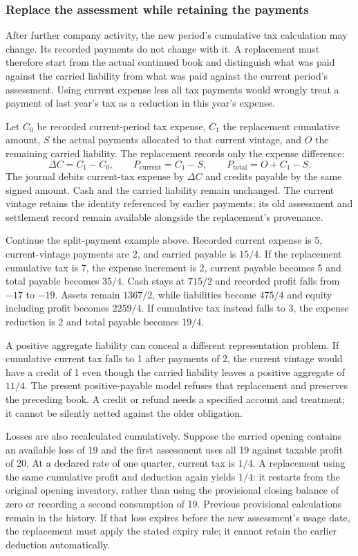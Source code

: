 

\subsubsection*{Replace the assessment while retaining the payments}
After further company activity, the new period's cumulative tax calculation may
change. Its recorded payments do not change with it. A replacement must therefore
start from the actual continued book and distinguish what was paid against the
carried liability from what was paid against the current period's assessment.
Using current expense less all tax payments would wrongly treat a payment of
last year's tax as a reduction in this year's expense.

Let $C_0$ be recorded current-period tax expense, $C_1$ the replacement cumulative
amount, $S$ the actual payments allocated to that current vintage, and $O$ the
remaining carried liability. The replacement records only the expense difference:
\[
  \Delta C=C_1-C_0,\qquad
  P_{\mathrm{current}}=C_1-S,\qquad
  P_{\mathrm{total}}=O+C_1-S.
\]
The journal debits current-tax expense by $\Delta C$ and credits payable by the
same signed amount. Cash and the carried liability remain unchanged. The current
vintage retains the identity referenced by earlier payments; its old assessment
and settlement record remain available alongside the replacement's provenance.

Continue the split-payment example above. Recorded current expense is 5,
current-vintage payments are 2, and carried payable is $15/4$. If the replacement
cumulative tax is 7, the expense increment is 2, current payable becomes 5 and
total payable becomes $35/4$. Cash stays at $715/2$ and recorded profit falls
from $-17$ to $-19$. Assets remain $1367/2$, while liabilities become $475/4$
and equity including profit becomes $2259/4$. If cumulative tax instead falls
to 3, the expense reduction is 2 and total payable becomes $19/4$.

A positive aggregate liability can conceal a different representation problem.
If cumulative current tax falls to 1 after payments of 2, the current vintage
would have a credit of 1 even though the carried liability leaves a positive
aggregate of $11/4$. The present positive-payable model refuses that replacement
and preserves the preceding book. A credit or refund needs a specified account
and treatment; it cannot be silently netted against the older obligation.

Losses are also recalculated cumulatively. Suppose the carried opening contains
an available loss of 19 and the first assessment uses all 19 against taxable
profit of 20. At a declared rate of one quarter, current tax is $1/4$. A
replacement using the same cumulative profit and deduction again yields $1/4$:
it restarts from the original opening inventory, rather than using the provisional
closing balance of zero or recording a second consumption of 19. Previous
provisional calculations remain in the history. If that loss expires before the
new assessment's usage date, the replacement must apply the stated expiry rule;
it cannot retain the earlier deduction automatically.

